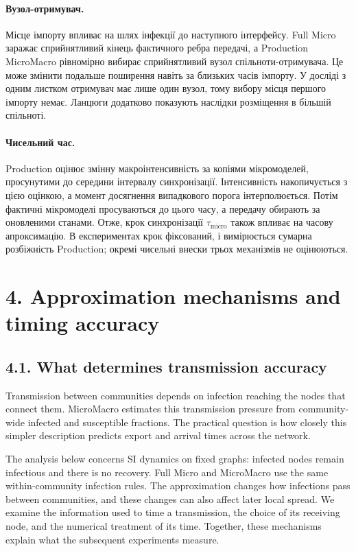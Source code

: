 \documentclass[10pt]{article}
\begin{document}
{\paragraph{Вузол-отримувач.}
Місце імпорту впливає на шлях інфекції до наступного інтерфейсу. Full Micro заражає сприйнятливий кінець фактичного ребра передачі, а Production MicroMacro рівномірно вибирає сприйнятливий вузол спільноти-отримувача. Це може змінити подальше поширення навіть за близьких часів імпорту. У досліді з одним листком отримувач має лише один вузол, тому вибору місця першого імпорту немає. Ланцюги додатково показують наслідки розміщення в більшій спільноті.

\paragraph{Чисельний час.}
Production оцінює змінну макроінтенсивність за копіями мікромоделей, просунутими до середини інтервалу синхронізації. Інтенсивність накопичується з цією оцінкою, а момент досягнення випадкового порога інтерполюється. Потім фактичні мікромоделі просуваються до цього часу, а передачу обирають за оновленими станами. Отже, крок синхронізації $\tau_{\mathrm{micro}}$ також впливає на часову апроксимацію. В експериментах крок фіксований, і вимірюється сумарна розбіжність Production; окремі чисельні внески трьох механізмів не оцінюються.
}{
\section*{4. Approximation mechanisms and timing accuracy}
\subsection*{4.1. What determines transmission accuracy}
Transmission between communities depends on infection reaching the nodes that connect them. MicroMacro estimates this transmission pressure from community-wide infected and susceptible fractions. The practical question is how closely this simpler description predicts export and arrival times across the network.

The analysis below concerns SI dynamics on fixed graphs: infected nodes remain infectious and there is no recovery. Full Micro and MicroMacro use the same within-community infection rules. The approximation changes how infections pass between communities, and these changes can also affect later local spread. We examine the information used to time a transmission, the choice of its receiving node, and the numerical treatment of its time. Together, these mechanisms explain what the subsequent experiments measure.

}
\end{document}
